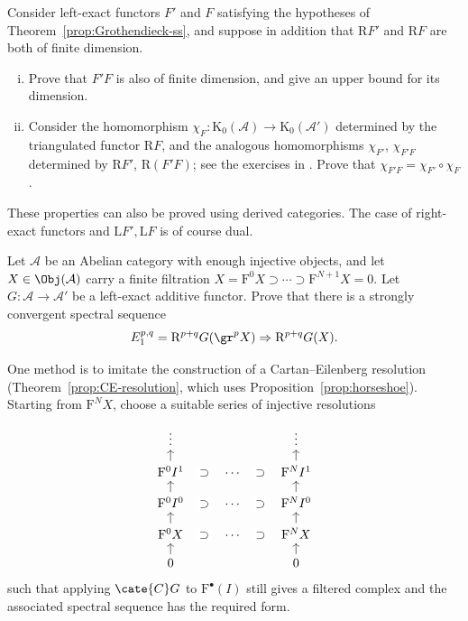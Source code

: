 \begin{Exercises}
	\item Consider left-exact functors $F'$ and $F$ satisfying the hypotheses
	of Theorem~\ref{prop:Grothendieck-ss}, and suppose in addition that
	$\mathrm{R}F'$ and $\mathrm{R}F$ are both of finite dimension.
	\begin{enumerate}[(i)]
		\item Prove that $F'F$ is also of finite dimension, and give an upper
		bound for its dimension.
		\item Consider the homomorphism
		$\chi_F:\mathrm{K}_0(\mathcal{A})\to\mathrm{K}_0(\mathcal{A}')$
		determined by the triangulated functor $\mathrm{R}F$, and the analogous
		homomorphisms $\chi_{F'}$, $\chi_{F'F}$ determined by
		$\mathrm{R}F'$, $\mathrm{R}(F'F)$; see the exercises in
		. Prove that
		$\chi_{F'F}=\chi_{F'}\circ\chi_F$.
	\end{enumerate}
	These properties can also be proved using derived categories. The case of
	right-exact functors and $\mathrm{L}F',\mathrm{L}F$ is of course dual.

	\item Let $\mathcal{A}$ be an Abelian category with enough injective
	objects, and let $X\in\Obj(\mathcal{A})$ carry a finite filtration
	$X=\mathrm{F}^0X\supset\cdots\supset\mathrm{F}^{N+1}X=0$. Let
	$G:\mathcal{A}\to\mathcal{A}'$ be a left-exact additive functor. Prove
	that there is a strongly convergent spectral sequence
	\[ E_1^{p,q}=\mathrm{R}^{p+q}G(\gr^pX)
	\Rightarrow\mathrm{R}^{p+q}G(X). \]
	\begin{hint}
		One method is to imitate the construction of a Cartan--Eilenberg
		resolution (Theorem~\ref{prop:CE-resolution}, which uses
		Proposition~\ref{prop:horseshoe}). Starting from $\mathrm{F}^NX$, choose
		a suitable series of injective resolutions
		\[\begin{tikzcd}[row sep=small]
			\vdots & & \vdots \\
			\mathrm{F}^0I^1 \arrow[u]
			\arrow[phantom,r,"\supset" description] & \cdots
			\arrow[phantom,r,"\supset" description] & \mathrm{F}^NI^1 \arrow[u] \\
			\mathrm{F}^0I^0 \arrow[u]
			\arrow[phantom,r,"\supset" description] & \cdots
			\arrow[phantom,r,"\supset" description] & \mathrm{F}^NI^0 \arrow[u] \\
			\mathrm{F}^0X \arrow[u]
			\arrow[phantom,r,"\supset" description] & \cdots
			\arrow[phantom,r,"\supset" description] & \mathrm{F}^NX \arrow[u] \\
			0 \arrow[u] & & 0 \arrow[u]
		\end{tikzcd}\]
		such that applying $\cate{C}G$ to $\mathrm{F}^\bullet(I)$ still gives
		a filtered complex and the associated spectral sequence has the
		required form.
	\end{hint}


\end{Exercises}
